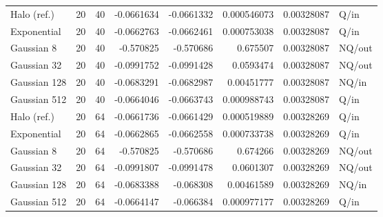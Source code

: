 \documentclass[fleqn,usenatbib]{mnras}
\begin{document}
\begin{table}
\begin{tabular}{lrrrrrrl}
Halo (ref.) & 20 & 40 & -0.0661634 & -0.0661332 & 0.000546073 & 0.00328087 & Q/in \\
Exponential & 20 & 40 & -0.0662763 & -0.0662461 & 0.000753038 & 0.00328087 & Q/in \\
Gaussian 8 & 20 & 40 & -0.570825 & -0.570686 & 0.675507 & 0.00328087 & NQ/out \\
Gaussian 32 & 20 & 40 & -0.0991752 & -0.0991428 & 0.0593474 & 0.00328087 & NQ/out \\
Gaussian 128 & 20 & 40 & -0.0683291 & -0.0682987 & 0.00451777 & 0.00328087 & NQ/in \\
Gaussian 512 & 20 & 40 & -0.0664046 & -0.0663743 & 0.000988743 & 0.00328087 & Q/in \\
Halo (ref.) & 20 & 64 & -0.0661736 & -0.0661429 & 0.000519889 & 0.00328269 & Q/in \\
Exponential & 20 & 64 & -0.0662865 & -0.0662558 & 0.000733738 & 0.00328269 & Q/in \\
Gaussian 8 & 20 & 64 & -0.570825 & -0.570686 & 0.674266 & 0.00328269 & NQ/out \\
Gaussian 32 & 20 & 64 & -0.0991807 & -0.0991478 & 0.0601307 & 0.00328269 & NQ/out \\
Gaussian 128 & 20 & 64 & -0.0683388 & -0.068308 & 0.00461589 & 0.00328269 & NQ/in \\
Gaussian 512 & 20 & 64 & -0.0664147 & -0.066384 & 0.000977177 & 0.00328269 & Q/in \\
\bottomrule
\end{tabular}
\end{table}
\end{document}
